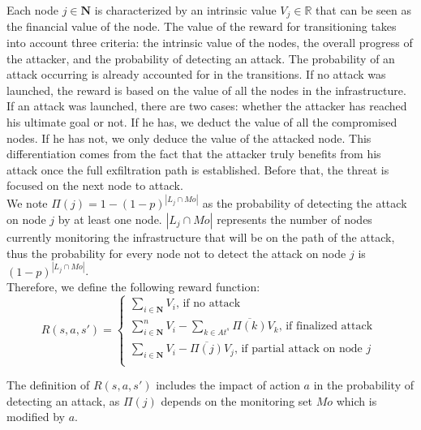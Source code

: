 Each node $j \in \textbf{N}$ is characterized by an intrinsic value $V_j \in \mathbb{R}$ that can be seen as the financial value of the node.
The value of the reward for transitioning takes into account three criteria: the intrinsic value of the nodes, the overall progress of the attacker, and the probability of detecting an attack. The probability of an attack occurring is already accounted for in the transitions.
If no attack was launched, the reward is based on the value of all the nodes in the infrastructure. 
If an attack was launched, there are two cases: whether the attacker has reached his ultimate goal or not.
If he has, we deduct the value of all the compromised nodes. If he has not, we only deduce the value of the attacked node.
This differentiation comes from the fact that the attacker truly benefits from his attack once the full exfiltration path is established. Before that, the threat is focused on the next node to attack.
\\We note $\Pi(j)=1 - (1-p)^{|L_j \cap Mo|}$ as the probability of detecting the attack on node $j$ by at least one node. $|L_j \cap Mo|$ represents the number of nodes currently monitoring the infrastructure that will be on the path of the attack, thus the probability for every node not to detect the attack on node $j$ is $(1-p)^{|L_j \cap Mo|}$.
\\
Therefore, we define the following reward function: %
\\
\begin{equation}
  R(s,a,s') =\begin{cases}
    \sum\limits_{i\in \textbf{N}} V_i \text{, if no attack}\\
    \sum\limits_{i\in \textbf{N}}^n V_i - \sum\limits_{k \in At^s} \overline{\Pi(k)}V_k \text{, if finalized attack }\\
    \sum\limits_{i\in \textbf{N}} V_i - \overline{\Pi(j)}V_j \text{, if partial attack on node $j$}\\
  \end{cases}
\end{equation}

The definition of $R(s,a,s')$ includes the impact of action $a$ in the probability of detecting an attack, as $\Pi(j)$ depends on the monitoring set $Mo$ which is modified by $a$.